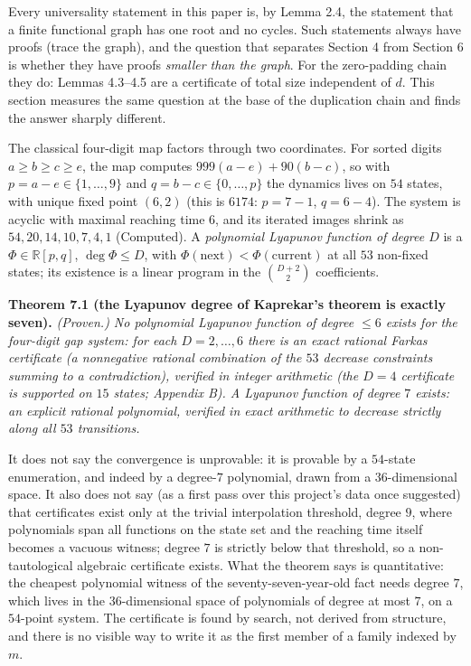 \documentclass[11pt,letterpaper]{article}
\theoremstyle{paperstyle}
\theoremstyle{paperstyledef}
\theoremstyle{paperstylerem}
\begin{document}
Every universality statement in this paper is, by Lemma 2.4, the statement that a finite functional graph has one root and no cycles. Such statements always have proofs (trace the graph), and the question that separates Section 4 from Section 6 is whether they have proofs \emph{smaller than the graph}. For the zero-padding chain they do: Lemmas 4.3--4.5 are a certificate of total size independent of \(d\). This section measures the same question at the base of the duplication chain and finds the answer sharply different.

The classical four-digit map factors through two coordinates. For sorted digits \(a \geq b \geq c \geq e\), the map computes \(999(a - e) + 90(b - c)\), so with \(p = a - e \in \{1, \dots, 9\}\) and \(q = b - c \in \{0, \dots, p\}\) the dynamics lives on \(54\) states, with unique fixed point \((6,2)\) (this is \(6174\): \(p = 7 - 1\), \(q = 6 - 4\)). The system is acyclic with maximal reaching time \(6\), and its iterated images shrink as \(54, 20, 14, 10, 7, 4, 1\) (Computed). A \emph{polynomial Lyapunov function of degree \(D\)} is a \(\Phi \in \mathbb{R}[p,q]\), \(\deg \Phi \leq D\), with \(\Phi(\text{next}) < \Phi(\text{current})\) at all \(53\) non-fixed states; its existence is a linear program in the \(\binom{D+2}{2}\) coefficients.

\textbf{Theorem 7.1 (the Lyapunov degree of Kaprekar's theorem is exactly seven).} \emph{(Proven.) No polynomial Lyapunov function of degree \(\leq 6\) exists for the four-digit gap system: for each \(D = 2, \dots, 6\) there is an exact rational Farkas certificate (a nonnegative rational combination of the \(53\) decrease constraints summing to a contradiction), verified in integer arithmetic (the \(D = 4\) certificate is supported on \(15\) states; Appendix B). A Lyapunov function of degree \(7\) exists: an explicit rational polynomial, verified in exact arithmetic to decrease strictly along all \(53\) transitions.}

It does not say the convergence is unprovable: it is provable by a \(54\)-state enumeration, and indeed by a degree-\(7\) polynomial, drawn from a \(36\)-dimensional space. It also does not say (as a first pass over this project's data once suggested) that certificates exist only at the trivial interpolation threshold, degree \(9\), where polynomials span all functions on the state set and the reaching time itself becomes a vacuous witness; degree \(7\) is strictly below that threshold, so a non-tautological algebraic certificate exists. What the theorem says is quantitative: the cheapest polynomial witness of the seventy-seven-year-old fact needs degree \(7\), which lives in the \(36\)-dimensional space of polynomials of degree at most \(7\), on a \(54\)-point system. The certificate is found by search, not derived from structure, and there is no visible way to write it as the first member of a family indexed by \(m\).
\end{document}
